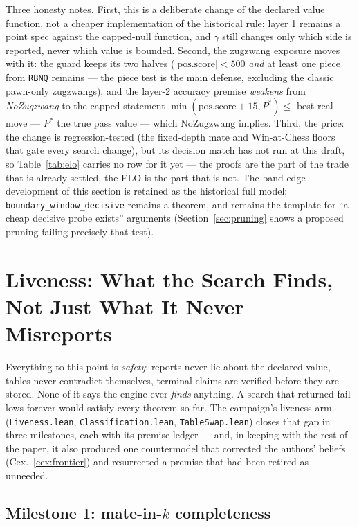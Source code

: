 \documentclass[11pt]{article}
\theoremstyle{plain}
\theoremstyle{definition}
\theoremstyle{remark}
\begin{document}
Three honesty notes.  First, this is a deliberate change of the
declared value function, not a cheaper implementation of the
historical rule: layer 1 remains a point spec against the capped-null
function, and $\gamma$ still changes only which side is reported,
never which value is bounded.  Second, the zugzwang exposure moves
with it: the guard keeps its two halves ($|\mathrm{pos.score}| < 500$
\emph{and} at least one piece from \texttt{RBNQ} remains --- the piece
test is the main defense, excluding the classic pawn-only zugzwangs),
and the layer-2 accuracy premise \emph{weakens} from
\emph{NoZugzwang} to the capped statement
$\min(\mathrm{pos.score}+15, P^*) \le{}$ best real move --- $P^*$ the
true pass value --- which $\mathrm{NoZugzwang}$ implies.  Third, the price: the change is
regression-tested (the fixed-depth mate and Win-at-Chess floors that
gate every search change), but its decision match has not run at this
draft, so Table~\ref{tab:elo} carries no row for it yet --- the
proofs are the part of the trade that is already settled, the ELO is
the part that is not.  The band-edge development of this section is
retained as the historical full model; \texttt{boundary\_window\_decisive}
remains a theorem, and remains the template for ``a cheap decisive
probe exists'' arguments (Section~\ref{sec:pruning} shows a proposed
pruning failing precisely that test).

\section{Liveness: What the Search Finds, Not Just What It Never Misreports}
\label{sec:liveness}

Everything to this point is \emph{safety}: reports never lie about the
declared value, tables never contradict themselves, terminal claims
are verified before they are stored.  None of it says the engine ever
\emph{finds} anything.  A search that returned fail-lows forever would
satisfy every theorem so far.  The campaign's liveness arm
(\texttt{Liveness.lean}, \texttt{Classification.lean},
\texttt{TableSwap.lean}) closes that gap in three milestones, each
with its premise ledger --- and, in keeping with the rest of the
paper, it also produced one countermodel that corrected the authors'
beliefs (Cex.~\ref{cex:frontier}) and resurrected a premise that had
been retired as unneeded.

\subsection{Milestone 1: mate-in-$k$ completeness}
\end{document}
